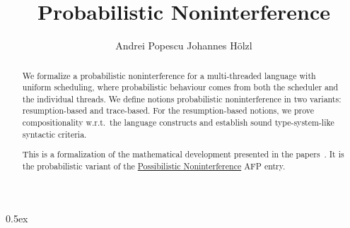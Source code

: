 \documentclass[11pt,a4paper]{article}
\begin{document}
\title{Probabilistic Noninterference}

\author{Andrei Popescu \hspace*{10ex} Johannes H\"{o}lzl}

\maketitle

\begin{abstract}

We formalize a probabilistic noninterference for a multi-threaded language with
uniform scheduling, where probabilistic behaviour comes from both the scheduler
and the individual threads. We define notions probabilistic noninterference 
in two variants: resumption-based and trace-based. For the resumption-based notions, 
we prove compositionality w.r.t.\ the language constructs and establish sound
type-system-like syntactic criteria.  

This is a formalization of the mathematical development presented in the
papers~\cite{cpp2013,calco2013}. It is the probabilistic variant of the 
\href{http://isa-afp.org/entries/Possibilistic_Noninterference.shtml}{Possibilistic Noninterference}
AFP entry.

\end{abstract}


\tableofcontents

\parindent 0pt\parskip 0.5ex





\end{document}
